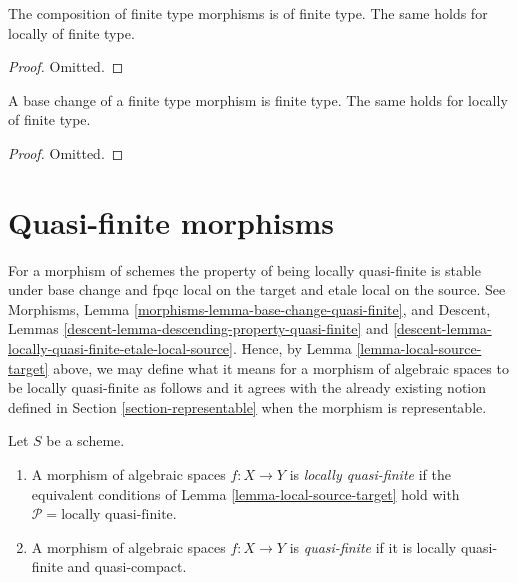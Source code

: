 \begin{lemma}
\label{lemma-composition-finite-type}
The composition of finite type morphisms is of finite type.
The same holds for locally of finite type.
\end{lemma}

\begin{proof}
Omitted.
\end{proof}

\begin{lemma}
\label{lemma-base-change-finite-type}
A base change of a finite type morphism is finite type.
The same holds for locally of finite type.
\end{lemma}

\begin{proof}
Omitted.
\end{proof}








\section{Quasi-finite morphisms}
\label{section-quasi-finite}

\noindent
For a morphism of schemes the property of being locally quasi-finite is
stable under base change and fpqc local on
the target and etale local on the source. See
Morphisms, Lemma \ref{morphisms-lemma-base-change-quasi-finite}, and
Descent, Lemmas \ref{descent-lemma-descending-property-quasi-finite} and
\ref{descent-lemma-locally-quasi-finite-etale-local-source}.
Hence, by
Lemma \ref{lemma-local-source-target}
above, we may define what it means for a morphism of algebraic spaces
to be locally quasi-finite as
follows and it agrees with the already existing notion defined in
Section \ref{section-representable}
when the morphism is representable.

\begin{definition}
\label{definition-locally-quasi-finite}
Let $S$ be a scheme.
\begin{enumerate}
\item A morphism of algebraic spaces $f : X \to Y$ is
{\it locally quasi-finite} if the equivalent conditions of
Lemma \ref{lemma-local-source-target} hold with
$\mathcal{P} = \text{locally quasi-finite}$.
\item A morphism of  algebraic spaces $f : X \to Y$ is
{\it quasi-finite} if it is locally quasi-finite and quasi-compact.
\end{enumerate}
\end{definition}

